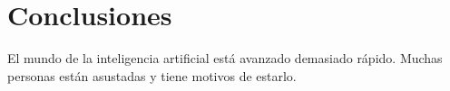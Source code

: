 \documentclass[../main.tex]{subfiles}
\begin{document}
\section{Conclusiones}
El mundo de la inteligencia artificial está avanzado demasiado rápido. Muchas personas están asustadas y tiene motivos de estarlo. 
\end{document}
